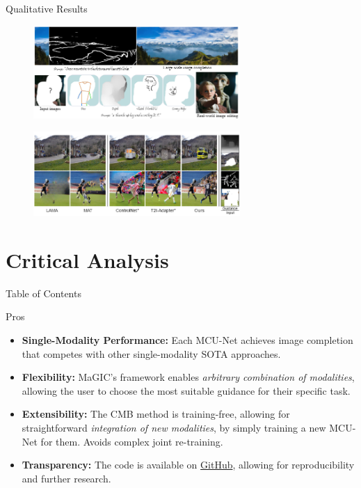 \documentclass[pdf]{beamer}
\begin{document}
\begin{frame}{Qualitative Results}
    \begin{figure}
        \centering
        \includegraphics[width=0.7\textwidth]{figures/examples.png}
    \end{figure}
    \begin{figure}
        \centering
        \includegraphics[width=0.7\textwidth]{figures/comparison.png}
    \end{figure}
\end{frame}

\section{Critical Analysis}
\begin{frame}{Table of Contents}
    \tableofcontents[currentsection]
\end{frame}
\begin{frame}{Pros}
    \begin{itemize}
        \item \textbf{Single-Modality Performance:} Each MCU-Net achieves image completion that competes with other single-modality SOTA approaches.
        \item \textbf{Flexibility:} MaGIC's framework enables \textit{arbitrary combination of modalities}, allowing the user to choose the most suitable guidance for their specific task.
        \item \textbf{Extensibility:} The CMB method is training-free, allowing for straightforward \textit{integration of new modalities}, by simply training a new MCU-Net for them. Avoids complex joint re-training.
        \item \textbf{Transparency:} The code is available on \hyperlink{https://github.com/yeates/MaGIC}{GitHub}, allowing for reproducibility and further research.
    \end{itemize}
\end{frame}
\end{document}
